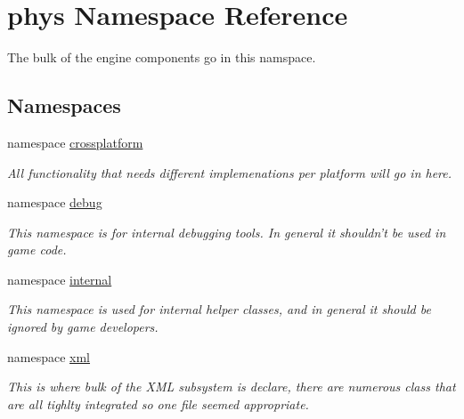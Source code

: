 \hypertarget{namespacephys}{
\section{phys Namespace Reference}
\label{df/dec/namespacephys}
}


The bulk of the engine components go in this namspace.  


\subsection*{Namespaces}
\begin{DoxyCompactItemize}
\item 
namespace \hyperlink{namespacephys_1_1crossplatform}{crossplatform}


\begin{DoxyCompactList}\small\item\em All functionality that needs different implemenations per platform will go in here. \item\end{DoxyCompactList}

\item 
namespace \hyperlink{namespacephys_1_1debug}{debug}


\begin{DoxyCompactList}\small\item\em This namespace is for internal debugging tools. In general it shouldn't be used in game code. \item\end{DoxyCompactList}

\item 
namespace \hyperlink{namespacephys_1_1internal}{internal}


\begin{DoxyCompactList}\small\item\em This namespace is used for internal helper classes, and in general it should be ignored by game developers. \item\end{DoxyCompactList}

\item 
namespace \hyperlink{namespacephys_1_1xml}{xml}


\begin{DoxyCompactList}\small\item\em This is where bulk of the XML subsystem is declare, there are numerous class that are all tighlty integrated so one file seemed appropriate. \item\end{DoxyCompactList}

\end{DoxyCompactItemize}
